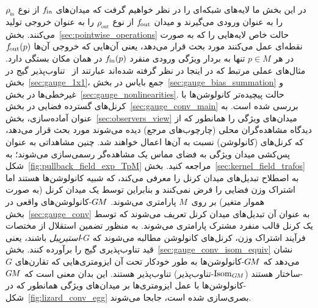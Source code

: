 در این بخش ما لایه‌های شبکه‌ای را در نظر خواهیم گرفت که میدان‌های $f_\textup{\;\!\!in}$ از نوع $\rhoin$ را به عنوان ورودی می‌گیرند و میدان $f_\textup{\:\!\!out}$ از نوع $\rhoout$ را به عنوان خروجی تولید می‌کنند.
بخش~\ref{sec:pointwise_operations} حالت خاص لایه‌هایی را که به صورت نقطه‌ای عمل می‌کنند مورد بحث قرار می‌دهد، یعنی آن‌هایی که خروجی آن‌ها $f_\textup{\:\!\!out}(p)$ در هر $p\in M$ تنها به بردار ویژگی ورودی منفرد $f_\textup{\;\!\!in}(p)$ در همان مکان بستگی دارد.
مثال‌های عملی مرتبط که در اینجا در نظر گرفته شده‌اند عبارتند از \onexonesit\ تناوب‌پذیر گیج در بخش~\ref{sec:gauge_1x1}، جمع بایاس در بخش~\ref{sec:gauge_bias_summation} و غیرخطی‌ها در بخش~\ref{sec:gauge_nonlinearities}.
حالت پیچیده‌تر کانولوشن‌ها با کرنل‌های گسترده فضایی در بخش~\ref{sec:gauge_conv_main} بررسی شده است.
به عنوان آماده‌سازی، بخش~\ref{sec:observers_view} میدان‌های ویژگی را همانطور که از دیدگاه مشاهده‌گران محلی (چارچوب‌های مرجع) دیده می‌شوند مورد بحث قرار می‌دهد، که کرنل‌های (کانولوشن) نسبت به آن‌ها اعمال خواهند شد.
چنین مشاهداتی به عنوان پس‌کشی میدان ویژگی به فضای مماس یک مشاهده‌گر رسمی‌سازی می‌شوند؛ به شکل~\ref{fig:pullback_field_exp_TpM} مراجعه کنید.
بخش~\ref{sec:kernel_field_trafos} به اصطلاح تبدیل‌های میدان کرنل را معرفی می‌کند، که شبیه کانولوشن‌ها هستند اما اشتراک وزن فضایی را فرض نمی‌کنند و بنابراین توسط یک میدان کرنل (به صورت هموار متغیر) بر روی~$M$ پارامتری می‌شوند.
$G\mkern-1.4muM$-کانولوشن‌های واقعی در بخش~\ref{sec:gauge_conv} به عنوان آن تبدیل‌های میدان کرنل تعریف می‌شوند که توسط یک کرنل قالب منفرد مشترک پارامتری می‌شوند.
به منظور تضمین استقلال از مختصات فرآیند اشتراک وزن، کرنل‌های کانولوشن مطالبه می‌شوند که $G$-\emph{استیریبل} باشند، یعنی قید تناوب‌پذیری گیج را برآورده کنند.
بخش~\ref{sec:gauge_conv_isom_equiv} نشان می‌دهد که $G\mkern-1.4muM$-کانولوشن‌ها به طور خودکار تحت آن ایزومتری‌هایی که تقارن‌های $G$-ساختار هستند ($\operatorname{Isom}_{G\mkern-1.4muM}$-تناوب‌پذیر) تناوب‌پذیر هستند.
این بدان معنی است که $G\mkern-1.4muM$-کانولوشن‌ها با عمل ایزومتری‌ها بر میدان‌های ویژگی همانطور که در شکل~\ref{fig:lizard_conv_egg} بصری‌سازی شده است، جابجا می‌شوند.